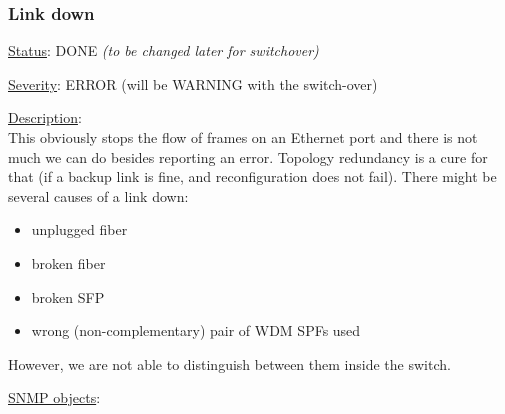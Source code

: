 \subsubsection{\bf Link down}
		\label{fail:data:link_down}
		\begin{pck_descr}
			\item [] \underline{Status}: DONE  \emph{(to be changed later for switchover)}
			\item [] \underline{Severity}: ERROR (will be WARNING with the
				switch-over)
			\item [] \underline{Description}:\\
				This obviously stops the flow of frames on an Ethernet port and there is
				not much we can do besides reporting an error. Topology redundancy is a
				cure for that (if a backup link is fine, and reconfiguration does not
				fail). There might be several causes of a link down:
				\begin{itemize}
					\item unplugged fiber
					\item broken fiber
					\item broken SFP
					\item wrong (non-complementary) pair of WDM SPFs used
				\end{itemize}
				However, we are not able to distinguish between them inside the switch.
			\item [] \underline{SNMP objects}:\\
				{\footnotesize
				\\
				\\
				\\
				\\
				 }
		\end{pck_descr}

